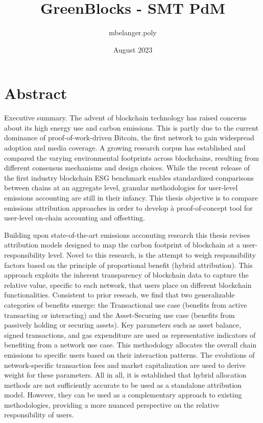 \documentclass[11pt]{report}
\title{GreenBlocks - SMT PdM}
\author{mbelanger.poly}
\date{August 2023}
\begin{document}

\section*{Abstract}

Executive summary.
The advent of blockchain technology has raised concerns about its high energy use and carbon emissions. This is partly due to the current dominance of proof-of-work-driven Bitcoin, the first network to gain widespread adoption and media coverage. A growing research corpus has established and compared the varying environmental footprints across blockchains, resulting from different consensus mechanisms and design choices. While the recent release of the first industry blockchain ESG benchmark enables standardized comparisons between chains at an aggregate level, granular methodologies for user-level emissions accounting are still in their infancy. This thesis objective is to compare emissions attribution approaches in order to develop à proof-of-concept tool for user-level on-chain accounting and offsetting.

Building upon state-of-the-art emissions acconuting research this thesis revises attribution models designed to map the carbon footprint of blockchain at a user-responsibility level. Novel to this research, is the attempt to weigh responsibility factors based on the principle of proportional benefit (hybrid attribution). This approach exploits the inherent transparency of blockchain data to capture the relative value, specific to each network, that users place on different blockchain functionalities. Consistent to prior reseach, we find that two generalizable categories of benefits emerge: the Transactional use case (benefits from active transacting or interacting) and the Asset-Securing use case (benefits from passively holding or securing assets). Key parameters such as asset balance, signed transactions, and gas expenditure are used as representative indicators of benefiting from a network use case. This methodology allocates the overall chain emissions to specific users based on their interaction patterns. The evolutions of network-specific transaction fees and market capitalization are used to derive weight for these parameters. All in all, it is established that hybrid allocation methods are not sufficiently accurate to be used as a standalone attribution model. However, they can be used as a complementary approach to existing methodologies, providing a more nuanced perspective on the relative responsibility of users.
\end{document}
